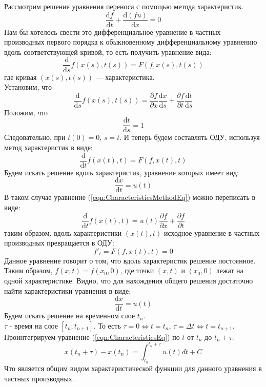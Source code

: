 \documentclass[12pt,a4paper]{article}
\begin{document}
Рассмотрим решение уравнения переноса с помощью метода характеристик.
\begin{equation}
\frac{\text{d}f}{\text{d}t} + \frac{\text{d}(f u)}{\text{d}x}=0
\end{equation}
Нам бы хотелось свести это дифференциальное уравнение в частных производных первого порядка к обыкновенному дифференциальному уравнению вдоль соответствующей кривой, то есть получить уравнение вида:
\[
\frac{\text{d}}{\text{d}s}f(x(s),t(s))=F(f,x(s),t(s))
\]
где кривая $(x(s),t(s))$ — характеристика.\\
Установим, что
\begin{equation}
\label{eqn:CharacteristicsMethodEq}
\frac{\text{d}}{\text{d}s}f(x(s),t(s))=\frac{\partial f}{\partial x}\frac{\text{d}x}{\text{d}s}+\frac{\partial f}{\partial t}\frac{\text{d}t}{\text{d}s}
\end{equation}
Положим, что
\[
\frac{\text{d}t}{\text{d}s}=1
\]
Следовательно, при $t(0)=0$, $s=t$. И теперь будем составлять ОДУ, используя метод характеристик в виде:
\[
\frac{\text{d}}{\text{d}t}f(x(t),t)=F(f,x(t),t)
\]
Будем искать решение вдоль характеристик, уравнение которых имеет вид:
\[
\frac{\text{d}x}{\text{d}t}=u(t)
\]
В таком случае уравнение (\ref{eqn:CharacteristicsMethodEq}) можно переписать в виде:
\[
\frac{\text{d}}{\text{d}t}f(x(t),t)=u(t)\frac{\partial f}{\partial x}+\frac{\partial f}{\partial t}
\]
таким образом, вдоль характеристики $(x(t),t)$ исходное уравнение в частных производных превращается в ОДУ:
\[
f'_t=F(f,x(t),t)=0
\]
Данное уравнение говорит о том, что вдоль характеристик решение постоянное. Таким образом, $f(x,t)=f(x_0,0)$, где точки $(x,t)$ и $(x_0,0)$ лежат на одной характеристике. Видно, что для нахождения общего решения достаточно найти характеристики уравнения в виде:
\begin{equation}
\label{eqn:CharacteristicsEq}
\frac{\text{d}x}{\text{d}t}=u(t)
\end{equation}
Будем искать решение на временном слое $t_n$.
\\$\tau$ - время на слое $[t_n; t_{n+1}]$. То есть $\tau=0 \Leftrightarrow t=t_n$, $\tau=\Delta t \Leftrightarrow t=t_{n+1}$.
\\Проинтегрируем уравнение (\ref{eqn:CharacteristicsEq}) по $t$ от $t_n$ до $t_n+\tau$:
\begin{equation}
\label{eqn:CommonCharacteristics}
x(t_n+\tau)-x(t_n)=\int_{t_n}^{t_n+\tau}u(t)dt + C
\end{equation}
Что является общим видом характеристической функции для данного уравнения в частных производных.
\end{document}
